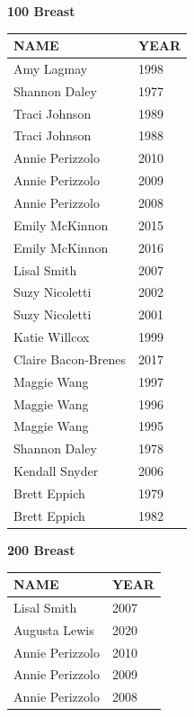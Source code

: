 \begin{table}[H]
\centering
\begin{minipage}[t]{0.48\textwidth}
\centering
\textbf{100 Breast}\\[0.1cm]
\begin{tabular}{@{}p{2.8cm}p{1.2cm}@{}}
\hline
    \textbf{NAME} & \textbf{YEAR} \\
\hline
    Amy Lagmay & 1998 \\
    Shannon Daley & 1977 \\
    Traci Johnson & 1989 \\
    Traci Johnson & 1988 \\
    Annie Perizzolo & 2010 \\
    Annie Perizzolo & 2009 \\
    Annie Perizzolo & 2008 \\
    Emily McKinnon & 2015 \\
    Emily McKinnon & 2016 \\
    Lisal Smith & 2007 \\
    Suzy Nicoletti & 2002 \\
    Suzy Nicoletti & 2001 \\
    Katie Willcox & 1999 \\
    Claire Bacon-Brenes & 2017 \\
    Maggie Wang & 1997 \\
    Maggie Wang & 1996 \\
    Maggie Wang & 1995 \\
    Shannon Daley & 1978 \\
    Kendall Snyder & 2006 \\
    Brett Eppich & 1979 \\
    Brett Eppich & 1982 \\
\hline
\end{tabular}
\end{minipage}\hfill
\begin{minipage}[t]{0.48\textwidth}
\centering
\textbf{200 Breast}\\[0.1cm]
\begin{tabular}{@{}p{2.8cm}p{1.2cm}@{}}
\hline
    \textbf{NAME} & \textbf{YEAR} \\
\hline
    Lisal Smith & 2007 \\
    Augusta Lewis & 2020 \\
    Annie Perizzolo & 2010 \\
    Annie Perizzolo & 2009 \\
    Annie Perizzolo & 2008 \\

\end{tabular}
\end{minipage}
\end{table}
